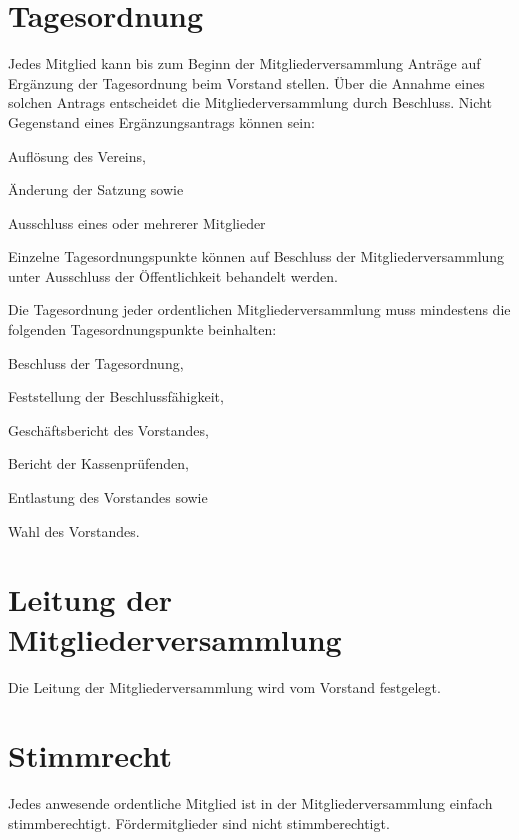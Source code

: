 \section{Tagesordnung}
	\begin{myEnum}
		\item Jedes Mitglied kann bis zum Beginn der Mitgliederversammlung Anträge auf Ergänzung der Tagesordnung beim Vorstand stellen. Über die Annahme eines solchen Antrags entscheidet die Mitgliederversammlung durch Beschluss. Nicht Gegenstand eines Ergänzungsantrags können sein:
			\begin{mySubEnum}
				\item Auflösung des Vereins,
				\item Änderung der Satzung sowie
				\item Ausschluss eines oder mehrerer Mitglieder
			\end{mySubEnum}
		\item Einzelne Tagesordnungspunkte können auf Beschluss der Mitgliederversammlung unter Ausschluss der Öffentlichkeit behandelt werden.
		\item Die Tagesordnung jeder ordentlichen Mitgliederversammlung muss mindestens die folgenden Tagesordnungspunkte beinhalten:
			\begin{mySubEnum}
				\item Beschluss der Tagesordnung,
				\item Feststellung der Beschlussfähigkeit,
				\item Geschäftsbericht des Vorstandes,
				\item Bericht der Kassenprüfenden,
				\item Entlastung des Vorstandes sowie
				\item Wahl des Vorstandes.
			\end{mySubEnum}
	\end{myEnum}

\section{Leitung der Mitgliederversammlung}
	Die Leitung der Mitgliederversammlung wird vom Vorstand festgelegt.
	
\section{Stimmrecht}
	Jedes anwesende ordentliche Mitglied ist in der Mitgliederversammlung einfach stimmberechtigt. Fördermitglieder sind nicht stimmberechtigt.
	
